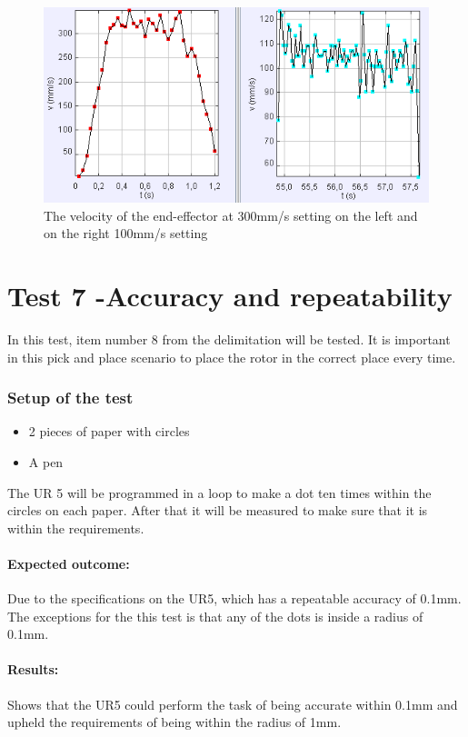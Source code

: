 \begin{figure}[H]
  \centering
    \includegraphics[width=\textwidth]{Design/velcit.PNG}
    \caption{The velocity of the end-effector at 300mm/s setting on the left and on the right 100mm/s setting}  \label{fig:velocitytest}
\end{figure}

\section{Test 7 -Accuracy and repeatability}
In this test, item number 8 from the delimitation will be tested. It is important in this pick and place scenario to place the rotor in the correct place every time. 

\subsubsection{Setup of the test}

\begin{itemize}
 \item 2 pieces of paper with circles 
 \item A pen 
\end{itemize}

The UR 5 will be programmed in a loop to make a dot ten times within the circles on each paper. After that it will be measured to make sure that it is within the requirements.

\paragraph{Expected outcome:}
Due to the specifications on the UR5, which has a repeatable accuracy of 0.1mm. The exceptions for the this test is that any of the dots is inside a radius of 0.1mm.

\paragraph{Results: }
Shows that the UR5 could perform the task of being accurate within 0.1mm and upheld the requirements of being within the radius of 1mm. 



